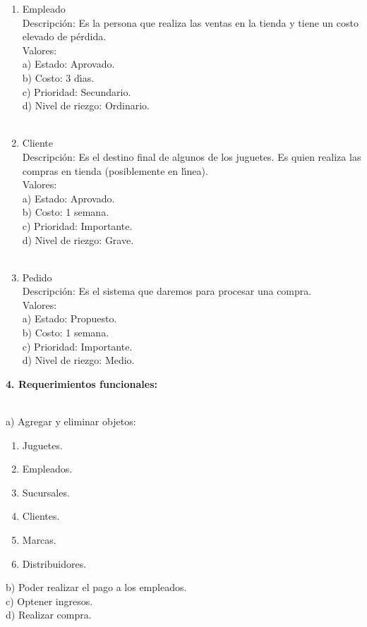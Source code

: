 \documentclass[letterpaper,11pt]{article}
\begin{document}
\begin{enumerate}
   \item Empleado\\
   Descripci\'on: Es la persona que realiza las ventas en la tienda y tiene un costo elevado de p\'erdida. \\

   Valores:\\
   a) Estado: Aprovado.\\
   b) Costo: 3 d\'{\i}as.\\
   c) Prioridad: Secundario.\\
   d) Nivel de riezgo: Ordinario.\\
   \\

   \item Cliente\\
   Descripci\'on: Es el destino final de algunos de los juguetes. Es quien realiza las compras en tienda (posiblemente en l\'{\i}nea).\\

   Valores:\\
   a) Estado: Aprovado.\\
   b) Costo: 1 semana.\\
   c) Prioridad: Importante.\\
   d) Nivel de riezgo: Grave.\\
   \\

   \item Pedido\\
   Descripci\'on: Es el sistema que daremos para procesar una compra.\\

   Valores:\\
   a) Estado: Propuesto.\\
   b) Costo: 1 semana.\\
   c) Prioridad: Importante.\\
   d) Nivel de riezgo: Medio.\\
 \end{enumerate}


 \begin{center}
   {\bf 4. Requerimientos funcionales: }
 \end{center}
 \\
 a) Agregar y eliminar objetos:
 \begin{enumerate}
 \item Juguetes.
 \item Empleados.
 \item Sucursales.
 \item Clientes.
 \item Marcas.
 \item Distribuidores.
 \end{enumerate}
 b) Poder realizar el pago a los empleados. \\
 c) Optener ingresos. \\
 d) Realizar compra. \\ 
\end{document}
